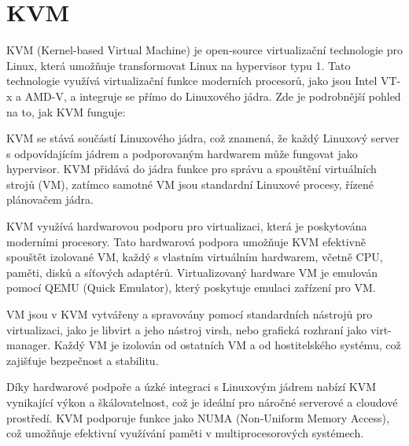 \section{KVM}
KVM (Kernel-based Virtual Machine) je open-source virtualizační technologie pro Linux, která umožňuje transformovat Linux na hypervisor typu 1. Tato technologie využívá virtualizační funkce moderních procesorů, jako jsou Intel VT-x a AMD-V, a integruje se přímo do Linuxového jádra. Zde je podrobnější pohled na to, jak KVM funguje:

KVM se stává součástí Linuxového jádra, což znamená, že každý Linuxový server s odpovídajícím jádrem a podporovaným hardwarem může fungovat jako hypervisor.
KVM přidává do jádra funkce pro správu a spouštění virtuálních strojů (VM), zatímco samotné VM jsou standardní Linuxové procesy, řízené plánovačem jádra.

KVM využívá hardwarovou podporu pro virtualizaci, která je poskytována moderními procesory. Tato hardwarová podpora umožňuje KVM efektivně spouštět izolované VM, každý s vlastním virtuálním hardwarem, včetně CPU, paměti, disků a síťových adaptérů.
Virtualizovaný hardware VM je emulován pomocí QEMU (Quick Emulator), který poskytuje emulaci zařízení pro VM.

VM jsou v KVM vytvářeny a spravovány pomocí standardních nástrojů pro virtualizaci, jako je libvirt a jeho nástroj virsh, nebo grafická rozhraní jako virt-manager.
Každý VM je izolován od ostatních VM a od hostitelského systému, což zajišťuje bezpečnost a stabilitu.

Díky hardwarové podpoře a úzké integraci s Linuxovým jádrem nabízí KVM vynikající výkon a škálovatelnost, což je ideální pro náročné serverové a cloudové prostředí.
KVM podporuje funkce jako NUMA (Non-Uniform Memory Access), což umožňuje efektivní využívání paměti v multiprocesorových systémech.

